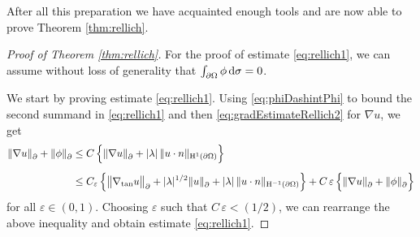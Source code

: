 After all this preparation we have acquainted enough tools and are now able to prove Theorem \ref{thm:rellich}.

\begin{proof}[Proof of Theorem \ref{thm:rellich}]
  For the proof of estimate \eqref{eq:rellich1}, we can assume without loss of generality that $\int_{\partial\Omega} \phi \, {\operatorname{d}\!{\sigma}} = 0$.

  We start by proving estimate \eqref{eq:rellich1}. 
  Using \eqref{eq:phiDashintPhi} to bound the second summand in \eqref{eq:rellich1} and then \eqref{eq:gradEstimateRellich2} for $\nabla u$, we get
  \begin{align*}
      \|\nabla u\|^{}_\partial + \|\phi\|^{}_\partial
      &\leq C\, \Big\{ \|\nabla u\|^{}_\partial + |\lambda|\, \|u \cdot n \|_{\mathrm{H}^1(\partial\Omega)} \Big\} \\[0.5em]
      &\leq C_\varepsilon\, \Big\{ \big\|\nabla_{\mathrm{tan}} u \big\|^{}_\partial + |\lambda|^{1/2} \|u\|^{}_\partial + |\lambda|\, \| u\cdot n\|_{\mathrm{H}^{-1}(\partial\Omega)} \Big\} 
      + C \,\varepsilon \,\Big\{ \|\nabla u\|^{}_\partial + \|\phi\|^{}_\partial \Big\}
  \end{align*}
  for all $\varepsilon \in (0,1)$.
  Choosing $\varepsilon$ such that $C\, \varepsilon < (1/2)$, we can rearrange the above inequality and obtain estimate \eqref{eq:rellich1}.


\end{proof}
